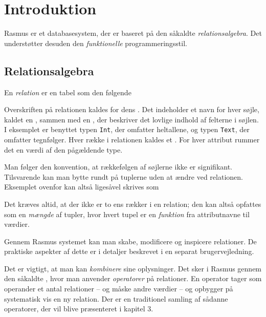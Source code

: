 \documentclass{article}
\newcounter{eks}
\begin{document}
\section{Introduktion}
{\sc Rasmus} er et databasesystem, der er baseret p\aa{} den s\aa{}kaldte
{\em relations\-algebra}. Det underst\o{}tter desuden den {\em funktionelle\/}
programmeringsstil.
        
\subsection{Relationsalgebra}
En {\em relation\/} er en tabel som den f\o{}lgende
\begin{center}
\end{center}
Overskriften p\aa{} relationen kaldes for dens {\em {}}. 
Det indeholder
et navn for hver s\o{}jle, kaldet en {\em {}}, 
sammen med en
{\em {}}, der beskriver det lovlige indhold af felterne i s\o{}jlen.
I eksemplet er benyttet typen \verb"Int", der omfatter heltallene, og typen
\verb"Text", der omfatter tegnf\o{}lger.
Hver r\ae{}kke i relationen kaldes et {\em {}}. For hver attribut
rummer det en v\ae{}rdi af den p\aa{}g\ae{}ldende type.

Man f\o{}lger den konvention, at r\ae{}kkef\o{}lgen af s\o{}jlerne
ikke er signifikant. Tilsvarende kan man bytte rundt p\aa{} tuplerne
uden at \ae{}ndre ved relationen. Eksemplet ovenfor kan alts\aa{}
liges\aa{}vel skrives som
\begin{center}
\end{center}
Det kr\ae{}ves altid, at der ikke
er to ens r\ae{}kker i en relation; den kan alts\aa{} opfattes som en
{\em m\ae{}ngde\/} af tupler, hvor hvert tupel er en {\em funktion\/}
fra attributnavne til v\ae{}rdier.

Gennem {\sc Rasmus} systemet kan man skabe, modificere og inspicere
relationer. De praktiske aspekter af dette er i detaljer beskrevet 
i en separat brugervejledning.

Det er vigtigt, at man kan {\em kombinere\/} sine oplysninger.
Det sker i {\sc Rasmus} gennem den s\aa{}kaldte
{\em {}}, hvor man 
anvender {\em operatorer\/} p\aa{} relationer. En operator
tager som operander et antal relationer -- og m\aa{}ske andre v\ae{}rdier --
og opbygger p\aa{} systematisk vis en ny relation.
Der er en traditionel samling af s\aa{}danne operatorer, der vil blive
pr\ae{}senteret i kapitel 3. 
\end{document}
